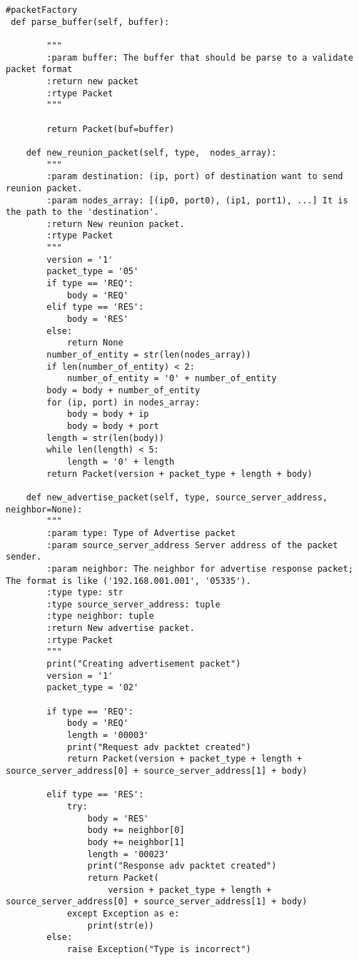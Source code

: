 \documentclass{article}
\begin{document}
\begin{lstlisting}
#packetFactory
 def parse_buffer(self, buffer):

        """
        :param buffer: The buffer that should be parse to a validate packet format
        :return new packet
        :rtype Packet
        """

        return Packet(buf=buffer)

    def new_reunion_packet(self, type,  nodes_array):
        """
        :param destination: (ip, port) of destination want to send reunion packet.
        :param nodes_array: [(ip0, port0), (ip1, port1), ...] It is the path to the 'destination'.
        :return New reunion packet.
        :rtype Packet
        """
        version = '1'
        packet_type = '05'
        if type == 'REQ':
            body = 'REQ'
        elif type == 'RES':
            body = 'RES'
        else:
            return None
        number_of_entity = str(len(nodes_array))
        if len(number_of_entity) < 2:
            number_of_entity = '0' + number_of_entity
        body = body + number_of_entity
        for (ip, port) in nodes_array:
            body = body + ip
            body = body + port
        length = str(len(body))
        while len(length) < 5:
            length = '0' + length
        return Packet(version + packet_type + length + body)

    def new_advertise_packet(self, type, source_server_address, neighbor=None):
        """
        :param type: Type of Advertise packet
        :param source_server_address Server address of the packet sender.
        :param neighbor: The neighbor for advertise response packet; The format is like ('192.168.001.001', '05335').
        :type type: str
        :type source_server_address: tuple
        :type neighbor: tuple
        :return New advertise packet.
        :rtype Packet
        """
        print("Creating advertisement packet")
        version = '1'
        packet_type = '02'

        if type == 'REQ':
            body = 'REQ'
            length = '00003'
            print("Request adv packtet created")
            return Packet(version + packet_type + length + source_server_address[0] + source_server_address[1] + body)

        elif type == 'RES':
            try:
                body = 'RES'
                body += neighbor[0]
                body += neighbor[1]
                length = '00023'
                print("Response adv packtet created")
                return Packet(
                    version + packet_type + length + source_server_address[0] + source_server_address[1] + body)
            except Exception as e:
                print(str(e))
        else:
            raise Exception("Type is incorrect")


\end{lstlisting}
\end{document}
